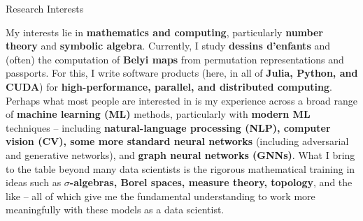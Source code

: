 \begin{rSection}{Research Interests}



My interests lie in \textbf{mathematics and computing}, particularly \textbf{number theory} and \textbf{symbolic algebra}. Currently, I study \textbf{dessins d'enfants} and (often) the computation of \textbf{Belyi maps} from permutation representations and passports. For this, I write software products (here, in all of \textbf{Julia, Python, and CUDA}) for \textbf{high-performance, parallel, and distributed computing}. Perhaps what most people are interested in is my experience across a broad range of \textbf{machine learning (ML)} methods, particularly with \textbf{modern ML} techniques -- including \textbf{natural-language processing (NLP), computer vision (CV), some more standard neural networks} (including adversarial and generative networks), and \textbf{graph neural networks (GNNs)}. What I bring to the table beyond many data scientists is the rigorous mathematical training in ideas such as \textbf{$\sigma$-algebras, Borel spaces, measure theory, topology}, and the like -- all of which give me the fundamental understanding to work more meaningfully with these models as a data scientist.

\end{rSection}